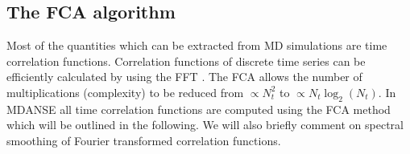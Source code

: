 \documentclass[a4paper,11pt]{article}
\begin{document}
\newpage
\appendix
\appendixpage
\addappheadtotoc
\begin{appendices}
\section{The FCA algorithm}
\label{fca}
Most of the quantities which can be extracted from \gls{MD} simulations are time correlation functions. 
Correlation functions of discrete time series can be efficiently calculated by using the \gls{FFT} \cite{Brigham}. The \gls{FCA} allows the number of multiplications (complexity) to be reduced from $\propto N_t^2$ to $\propto N_t \log_2(N_t)$. In 
\gls{MDANSE} all time correlation functions are computed using the \gls{FCA} method which will be outlined in the 
following. We will also briefly comment on spectral smoothing of Fourier transformed correlation functions.


\end{appendices}
\end{document}
